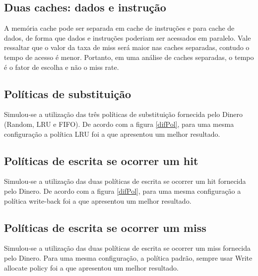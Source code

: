 \documentclass[12pt,a4paper]{article}
\begin{document}

\subsection{Duas caches:  dados e  instrução}
A memória cache pode ser separada em cache de instruções e para cache de dados,
de forma que dados e instruções poderiam ser acessados em paralelo. 
Vale ressaltar que o valor da taxa de miss será maior nas caches
separadas, contudo o tempo de acesso é menor.
Portanto, em uma análise de caches separadas, o tempo é o fator de
escolha e não o miss rate.

\subsection{Políticas de substituição}
Simulou-se a utilização das três políticas de substituição fornecida
pelo Dinero (Random, LRU e FIFO).
De acordo com a figura \ref{difPol}, para uma mesma configuração a política LRU foi a que apresentou um
melhor resultado.



\subsection{Políticas de escrita se ocorrer um hit}
Simulou-se a utilização das duas políticas de escrita se ocorrer um
hit fornecida pelo Dinero.
De acordo com a figura \ref{difPol}, para uma mesma configuração a política write-back foi a que apresentou um
melhor resultado.

\subsection{Políticas de escrita se ocorrer um miss}
Simulou-se a utilização das duas políticas de escrita se ocorrer um
miss fornecida pelo Dinero.
Para uma mesma configuração, a política padrão, sempre usar Write allocate policy foi a que apresentou um
melhor resultado.
\end{document}
